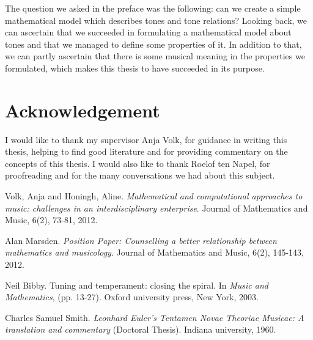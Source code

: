 \documentclass[a4paper]{book}
\theoremstyle{definition}
\begin{document}
The question we asked in the preface was the following:
can we create a simple mathematical model which describes tones and tone relations?
Looking back, we can ascertain that we succeeded in formulating a mathematical model about tones and that we managed to define some properties of it.
In addition to that, we can partly ascertain that there is some musical meaning in the properties we formulated, which makes this thesis to have succeeded in its purpose.

\section*{Acknowledgement}
I would like to thank my supervisor Anja Volk, for guidance in writing this thesis, helping to find good literature and for providing commentary on the concepts of this thesis.
I would also like to thank Roelof ten Napel, for proofreading and for the many conversations we had about this subject.


\begin{thebibliography}{4}

        Volk, Anja and Honingh, Aline.
        \emph{Mathematical and computational approaches to music: challenges in an interdisciplinary enterprise}.
        Journal of Mathematics and Music, 6(2), 73-81, 2012.

        Alan Marsden.
        \emph{Position Paper: Counselling a better relationship between mathematics and musicology}.
        Journal of Mathematics and Music, 6(2), 145-143, 2012.

        Neil Bibby.
        Tuning and temperament: closing the spiral.
        In \emph{Music and Mathematics}, (pp. 13-27).
        Oxford university press, New York, 2003.

        Charles Samuel Smith.
        \emph{Leonhard Euler's Tentamen Novae Theoriae Musicae: A translation and commentary}
        (Doctoral Thesis). Indiana university, 1960.

\end{thebibliography}
\end{document}
